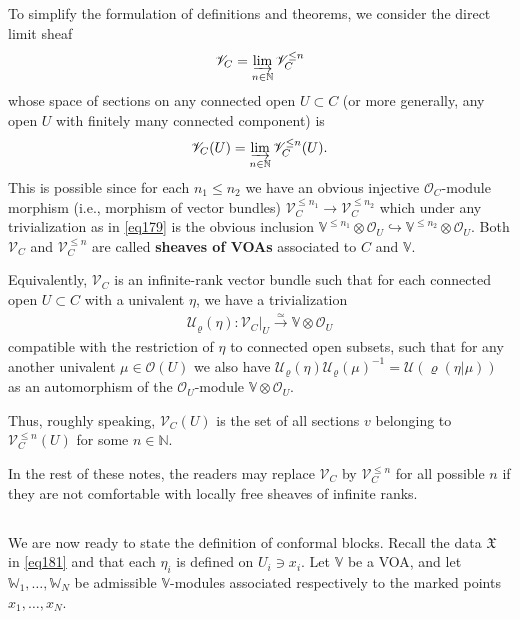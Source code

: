 \documentclass[12pt,a4paper,notitlepage]{article}
\theoremstyle{definition}
\theoremstyle{plain}
\newcommand{\fk}{\mathfrak}
\newcommand{\mc}{\mathcal}
\newcommand{\scr}{\mathscr}
\newcommand{\Vbb}{\mathbb V}
\newcommand{\Wbb}{\mathbb W}
\newcommand{\Nbb}{\mathbb N}
\numberwithin{equation}{section}
\begin{document}
To simplify the formulation of definitions and theorems, we consider the direct limit sheaf \index{V@$\scr V_C^{\leq n},\scr V_C$}
\begin{align*}
\scr V_C=\varinjlim_{n\in\Nbb}\scr V^{\leq n}_C	
\end{align*}
whose space of sections on any connected open $U\subset C$ (or more generally, any open $U$ with finitely many connected component) is
\begin{align*}
\scr V_C(U)=\varinjlim_{n\in\Nbb}\scr V^{\leq n}_C(U).
\end{align*}
This is possible since for each $n_1\leq n_2$ we have an obvious injective $\scr O_C$-module morphism (i.e., morphism of vector bundles) $\scr V^{\leq n_1}_C\rightarrow\scr V^{\leq n_2}_C$ which under any trivialization as in \eqref{eq179} is the obvious inclusion $\Vbb^{\leq n_1}\otimes\scr O_U\hookrightarrow\Vbb^{\leq n_2}\otimes\scr O_U$. Both $\scr V_C$ and $\scr V_C^{\leq n}$ are called \textbf{sheaves of VOAs} associated to $C$ and $\Vbb$.


Equivalently, $\scr V_C$ is an infinite-rank vector bundle such that for each connected open $U\subset C$ with a univalent $\eta$, we have a trivialization
\begin{align*}
\mc U_\varrho(\eta)	:\scr V_C|_U\xrightarrow{\simeq}\Vbb\otimes\scr O_U
\end{align*}
compatible with the restriction of $\eta$ to connected open subsets, such that for any another univalent $\mu\in\scr O(U)$ we also have $\mc U_\varrho(\eta)\mc U_\varrho(\mu)^{-1}=\mc U(\varrho(\eta|\mu))$ as an automorphism of the $\scr O_U$-module $\Vbb\otimes\scr O_U$.


Thus, roughly speaking, $\scr V_C(U)$ is the set of all sections $v$ belonging to $\scr V_C^{\leq n}(U)$ for some $n\in\Nbb$.

In the rest of these notes, the readers may replace $\scr V_C$ by  $\scr V_C^{\leq n}$ for all possible $n$ if they are not comfortable with  locally free sheaves of infinite ranks.




\subsection{}

We are now ready to state the definition of conformal blocks. Recall the data $\fk X$ in \eqref{eq181} and that each $\eta_i$ is defined on $U_i\ni x_i$. Let $\Vbb$ be a VOA, and let $\Wbb_1,\dots,\Wbb_N$ be admissible $\Vbb$-modules associated respectively to the marked points $x_1,\dots,x_N$.
\end{document}
